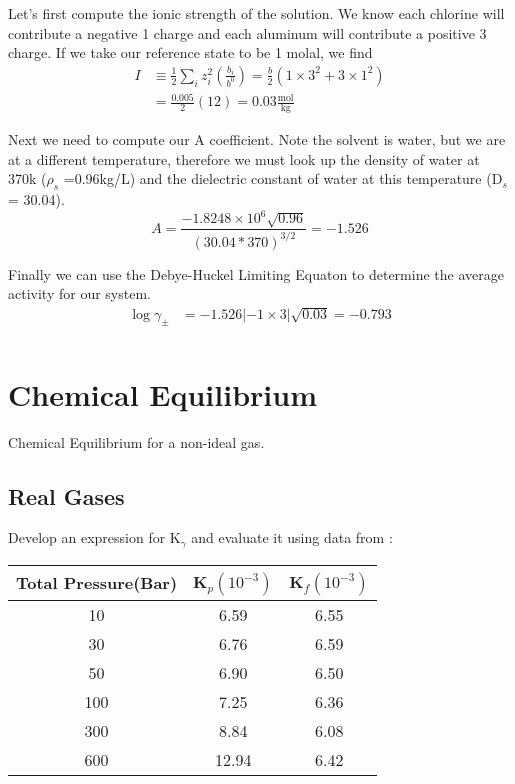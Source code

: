 \documentclass{article}
\newcommand{\be}{\begin{equation}}
\newcommand{\ee}{\end{equation}}
\begin{document}
Let's first compute the ionic strength of the solution. 
We know each chlorine will contribute a negative 1 charge and each aluminum will contribute a positive 3 charge. 
If we take our reference state to be 1 molal, we find
\be
\begin{split}
I &\equiv \frac{1}{2}\sum_i z_i^2\left(\frac{b_i}{b^0}\right) = \frac{b}{2} \left(1\times 3^2 + 3 \times 1^2\right) \\
&= \frac{0.005}{2}(12) = 0.03 \frac{\text{mol}}{\text{kg}}
\end{split}
\ee

Next we need to compute our A coefficient. 
Note the solvent is water, but we are at a different temperature, therefore we must look up the density of water at 370k ($\rho_s$ =0.96kg/L) and the dielectric constant of water at this temperature (D$_s$ = 30.04). 
\be
A = \frac{-1.8248\times 10^6 \sqrt{0.96}}{(30.04*370)^{3/2}} = -1.526
\ee

Finally we can use the Debye-Huckel Limiting Equaton to determine the average activity for our system. 
\be
\begin{split}
\log \gamma_\pm &= -1.526 |-1\times 3|\sqrt{0.03} = -0.793\\
\end{split}
\ee

\newpage

\section{Chemical Equilibrium}
 Chemical Equilibrium for a non-ideal gas.
 
\subsection{Real Gases}
Develop an expression for K$_\gamma$ and evaluate it using data from : 
 
 \begin{center}
 \begin{tabular}{||c| c |c ||} 
 \hline
 Total Pressure(Bar) & K$_p(10^{-3})$ & K$_f(10^{-3})$  \\ [0.5ex] 
 \hline\hline
 10 & 6.59 & 6.55  \\ 
 \hline
 30 & 6.76 & 6.59  \\
 \hline
 50 & 6.90 & 6.50  \\
 \hline
 100 & 7.25 & 6.36  \\
 \hline
 300 & 8.84 & 6.08  \\  
 \hline
 600 & 12.94 & 6.42 \\ 
 \hline
\end{tabular}
\end{center}
\end{document}

